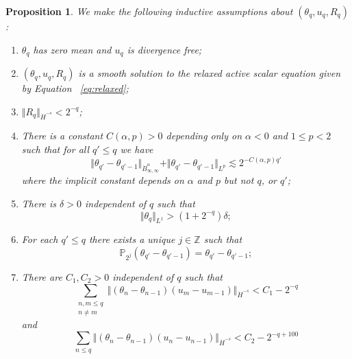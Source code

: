 \documentclass[10pt,a4paper]{amsart}
\newtheorem{proposition}{Proposition}
\newcommand{\Z}{\mathbb Z}
\begin{document}
\begin{proposition}\label{prop:ind}
    We make the following inductive assumptions about $(\theta_q,u_q,R_q)$:
    \begin{enumerate}
        \item\label{i:1} $\theta_q$ has zero mean and $u_q$ is divergence free;
        \item\label{i:2} $(\theta_q,u_q,R_q)$ is a smooth solution to the relaxed active scalar equation given by Equation ~\eqref{eq:relaxed};
        \item\label{i:3} $\Vert R_q \Vert_{\dot{H}^{-s}} < 2^{-q}$;
        \item\label{i:4} There is a constant $C(\alpha,p) > 0$ depending only on $\alpha < 0$ and $1 \leq p < 2$ such that for all $q' \leq q$ we have
        $$
        \Vert \theta_{q'} - \theta_{q'-1} \Vert_{\dot{B}^\alpha_{\infty,\infty}} + \Vert \theta_{q'} - \theta_{q'-1} \Vert_{L^p} \lesssim 2^{-C(\alpha,p)q'}
        $$
        where the implicit constant depends on $\alpha$ and $p$ but not $q$, or $q'$;
        \item\label{i:5} There is $\delta > 0$ independent of $q$ such that
        $$
        \Vert \theta_q \Vert_{L^1} > (1 + 2^{-q})\delta;
        $$
        \item\label{i:6} For each $q' \leq q$ there exists a unique $j \in \Z$ such that
        $$
        \mathbb{P}_{2^j}(\theta_{q'} - \theta_{q'-1}) = \theta_{q'} - \theta_{q'-1};
        $$
        \item\label{i:7} There are $C_1,C_2 > 0$ independent of $q$ such that
        $$
        \sum_{\substack{n,m \leq q\\ n \not  = m}} \Vert (\theta_n - \theta_{n-1}) (u_m - u_{m-1}) \Vert_{\dot{H}^{-s}} < C_1 - 2^{-q}
        $$
        and
        $$
         \sum_{n \leq q} \Vert (\theta_n - \theta_{n-1}) (u_n - u_{n-1}) \Vert_{\dot{H}^{-s}} < C_2 - 2^{-q + 100}
        $$
    \end{enumerate}
\end{proposition}
\end{document}
